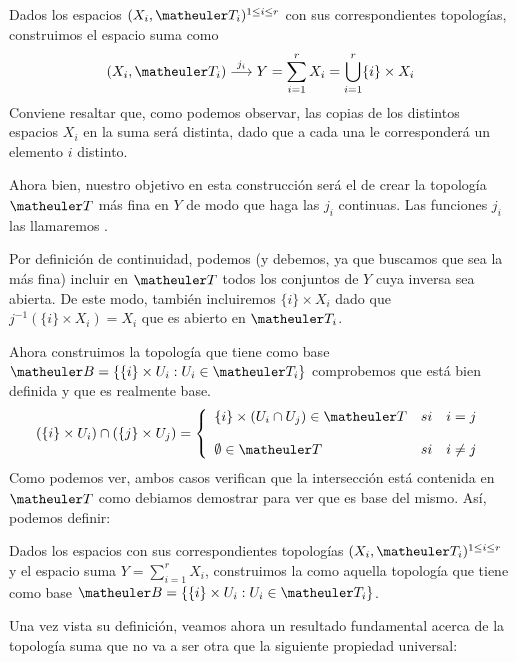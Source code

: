 Dados los espacios $(X_i, \T_i)^{1\le i \le r}$ con sus correspondientes topologías, construimos el espacio suma como
\begin{equation}
(X_i, \T_i)\stackrel{j_i}\longrightarrow Y=\sum_{i=1}^rX_i=\bigcup_{i=1}^r\{i\}\times X_i
\end{equation}
Conviene resaltar que, como podemos observar, las copias de los distintos espacios $X_i$ en la suma será distinta, dado que a cada una le corresponderá un elemento $i$ distinto.

Ahora bien, nuestro objetivo en esta construcción será el de crear la topología $\T$ más fina en $Y$ de modo que haga las $j_i$ continuas. Las funciones $j_i$ las llamaremos .

Por definición de continuidad, podemos (y debemos, ya que buscamos que sea la más fina) incluir en $\T$ todos los conjuntos de $Y$ cuya inversa sea abierta.
De este modo, también incluiremos $\{i\}\times X_i$ dado que $j^{-1}(\{i\}\times X_i)=X_i$ que es abierto en $\T_i$.

Ahora construimos la topología que tiene como base $\B=\{\{i\}\times U_i:U_i\in\T_i\}$ comprobemos que está bien definida y que es realmente base.
\begin{equation}
(\{i\}\times U_i)\cap(\{j\}\times U_j)=
\left\{ \begin{array}{lcc}
\{i\}\times(U_i\cap U_j)\in\T &   si  & i=j \\
\\  \emptyset\in\T& si & i\neq j 
\end{array}
\right.
\end{equation}
Como podemos ver, ambos casos verifican que la intersección está contenida en $\T$ como debiamos demostrar para ver que es base del mismo.
Así, podemos definir:
\begin{defi}
	Dados los espacios con sus correspondientes topologías $(X_i, \T_i)^{1\le i \le r}$ y el espacio suma $Y=\sum_{i=1}^rX_i$, construimos la  como aquella topología que tiene como base $\B=\{\{i\}\times U_i:U_i\in\T_i\}$.
\end{defi}

Una vez vista su definición, veamos ahora un resultado fundamental acerca de la topología suma que no va a ser otra que la siguiente propiedad universal:

